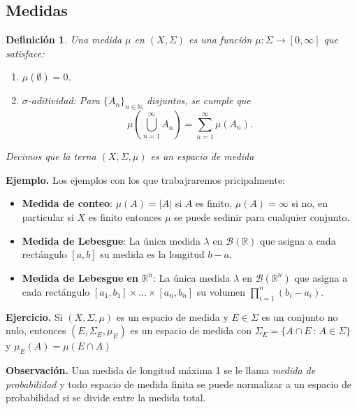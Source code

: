 \documentclass[letterpaper]{book}
\newtheorem{def.}{Definici\'on}[section]
\newcommand{\exe}{{\noindent \sc \textbf{Ejercicio. }}}
\newcommand{\eje}{{\noindent \sc \textbf{Ejemplo. }}}
\newcommand{\obs}{{\noindent \sc \textbf{Observación. }}}
\newcommand{\sig}{\ensuremath{\Sigma}}
\newcommand{\re}{\ensuremath{\mathbb R }}
\begin{document}
\subsection{Medidas}
\begin{def.}
Una medida $\mu$ en $(X, \sig)$ es una función $\mu: \sig \to [0, \infty]$ que satisface:
\begin{enumerate}
    \item $\mu(\emptyset) = 0$.
    \item $\sigma$-aditividad: Para $\{A_n\}_{n \in \mathbb{N}}$ disjuntos, se cumple que
      \[
      \mu\left(\bigcup_{n=1}^\infty A_n\right) = \sum_{n=1}^\infty \mu(A_n).
      \]
\end{enumerate}
Decimos que la terna $(X,\sig,\mu)$ es un espacio de \emph{medida}
\end{def.}

\eje Los ejemplos con los que trabajraremos pricipalmente:
\begin{itemize}
    \item \textbf{Medida de conteo}: $\mu(A) = |A|$ si $A$ es finito, $\mu(A) = \infty$ si no, en particular si $X$ es finito entonces $\mu$ se puede sedinir para cualquier conjunto.
    \item \textbf{Medida de Lebesgue}: La única medida $\lambda$ en $\mathcal{B}(\mathbb{R})$ que asigna a cada rectángulo $[a,b]$ su medida es la longitud $b - a$.
    \item \textbf{Medida de Lebesgue en $\re^n$}: La única medida $\lambda$ en $\mathcal{B}(\mathbb{R}^n)$ que asigna a cada rectángulo $[a_1, b_1] \times \dots \times [a_n, b_n]$ su volumen $\prod_{i=1}^n (b_i - a_i)$.
\end{itemize}

\exe Si $(X,\sig,\mu)$ es un espacio de medida y $E\in\sig$ es un conjunto no nulo, entonces $(E,\sig_E,\mu_E)$ es un espacio de medida con $\sig_E=\{A\cap E\,:\,A\in\sig\}$ y $\mu_E(A)=\mu(E\cap A)$

\obs Una medida de longitud máxima 1 se le llama \emph{medida de probabilidad} y todo espacio de medida finita se puede normalizar a un espacio de probabilidad si se divide entre la medida total.
\end{document}
